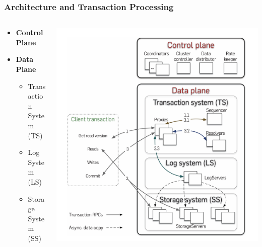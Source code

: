 \begin{frame}
    \frametitle{Architecture and Transaction Processing}
    \begin{columns}
        \begin{column}{0.5\textwidth}
            \begin{itemize}
                \item \textbf{Control Plane}
                \item \textbf{Data Plane}
                \begin{itemize}
                    \item Transaction System (TS)
                    \item Log System (LS)
                    \item Storage System (SS)
                \end{itemize}
            \end{itemize}
        \end{column}
        \begin{column}{0.5\textwidth}
            \centering
            \includegraphics[width=\textwidth]{img/2-Architecture/Architecture and transaction processing.png}
        \end{column}
    \end{columns}
\end{frame}


